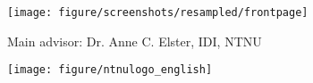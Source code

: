 \pagestyle{empty}

\noindent

\begin{center}
    \huge\bfseries
     	\projecttitle 
\end{center}

\vfill
\begin{center}
    \Large
    	\course
\end{center}

\begin{center}
\texttt{[image: figure/screenshots/resampled/frontpage]}
\end{center}

\vfill
\begin{center}
    \Large
    	\me 
\end{center}
\begin{center}
    \Large
    	Main advisor: Dr. Anne C. Elster, IDI, NTNU
\end{center}

\vfill
\begin{center}
   \texttt{[image: figure/ntnulogo\_english]}
	\vfill
	\Large\bfseries
		\period
\end{center}

\cleardoublepage
